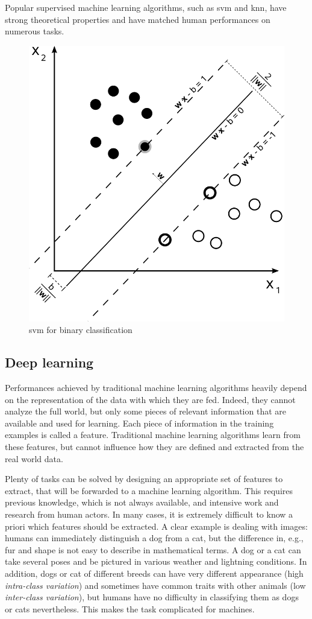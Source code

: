 \documentclass[%
    corpo=12pt,
    twoside,
    stile=classica,   
    tipotesi=magistrale,
    evenboxes,
    english,
	numerazioneromana,
]{toptesi}
\begin{document}
Popular supervised machine learning algorithms, such as \gls{svm} and \gls{knn}, have strong theoretical properties and have matched human performances on numerous tasks.

\begin{figure}[ht]
	\centering
	\includegraphics[width=.45\linewidth]{imgs/svm.png}
	\caption{\Gls{svm} for binary classification}
	\label{fig:supervised}
\end{figure}

\subsection{Deep learning}
Performances achieved by traditional machine learning algorithms heavily depend on the representation of the data with which they are fed. Indeed, they cannot analyze the full world, but only some pieces of relevant information that are available and used for learning. Each piece of information in the training examples is called a feature. Traditional machine learning algorithms learn from these features, but cannot influence how they are defined and extracted from the real world data.

\medskip
Plenty of tasks can be solved by designing an appropriate set of features to extract, that will be forwarded to a machine learning algorithm. This requires previous knowledge, which is not always available, and intensive work and research from human actors. In many cases, it is extremely difficult to know a priori which features should be extracted. A clear example is dealing with images: humans can immediately distinguish a dog from a cat, but the difference in, e.g., fur and shape is not easy to describe in mathematical terms. A dog or a cat can take several poses and be pictured in various weather and lightning conditions. In addition, dogs or cat of different breeds can have very different appearance (high \textit{intra-class variation}) and sometimes have common traits with other animals (low \textit{inter-class variation}), but humans have no difficulty in classifying them as dogs or cats nevertheless. This makes the task complicated for machines.
\end{document}
